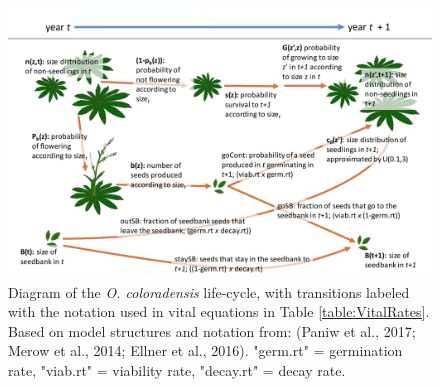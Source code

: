 \documentclass[12pt, letterpaper]{article}
\begin{document}
\begin{figure}[h]
    \centering
    \includegraphics[width=1\textwidth]{figures/COBP_lifecyclediagram_new.pdf}
    \caption{Diagram of the \textit{O. coloradensis} life-cycle, with transitions labeled with the notation used in vital equations in Table \ref{table:VitalRates}. Based on model structures and notation from: (Paniw et al., 2017; Merow et al., 2014; Ellner et al., 2016). "germ.rt" = germination rate, "viab.rt" = viability rate, "decay.rt" = decay rate.}
    \label{fig:lifecycle}
\end{figure}
\end{document}
